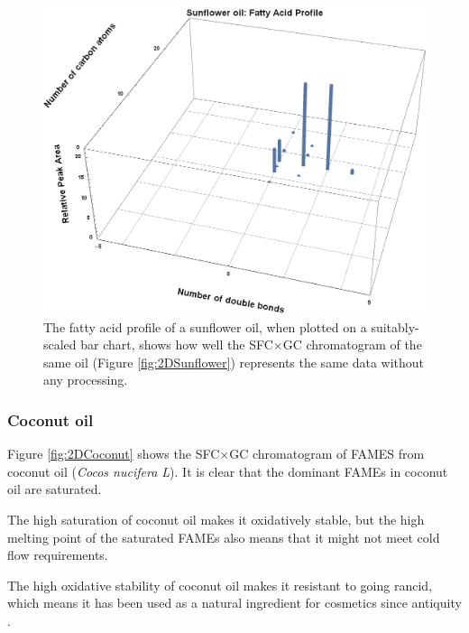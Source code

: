 \begin{figure}
\centering
\includegraphics[width=\textwidth]{Figures/BarChart.png}
\decoRule

\caption[3D Bar chart of fatty acid profile]{The fatty acid profile of a
sunflower oil, when plotted on a suitably-scaled bar chart, shows how well the
SFC×GC chromatogram of the same oil (Figure \ref{fig:2DSunflower}) represents
the same data without any processing.}

\label{fig:2DSunflowerBarChart}
\end{figure}

\subsubsection{Coconut oil}

Figure \ref{fig:2DCoconut} shows the SFC×GC chromatogram of FAMES from coconut
oil (\textit{Cocos nucifera L}). It is clear that the dominant FAMEs in coconut
oil are saturated.

The high saturation of coconut oil makes it oxidatively stable, but the high
melting point of the saturated FAMEs also means that it might not meet
cold flow requirements.

The high oxidative stability of coconut oil makes it resistant to going rancid,
which means it has been used as a natural ingredient for cosmetics since
antiquity \autocite{Berdick1972}.

